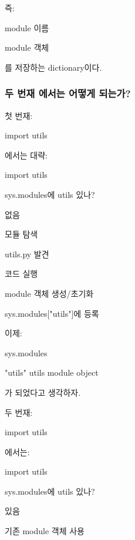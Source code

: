 즉:

\begin{dhksmry}[centered]
module 이름

\da

module 객체
\end{dhksmry}

를 저장하는 dictionary이다.

\subsubsection{두 번재 에서는 어떻게 되는가?}

첫 번재:

\begin{dhkcode}
import utils
\end{dhkcode}

에서는 대략:

\begin{dhksmry}[centered]
import utils

\da

sys.modules에 utils 있나?

\da

없음

\da

모듈 탐색

\da

utils.py 발견

\da

코드 실행

\da

module 객체 생성/초기화

\da

sys.modules["utils"]에 등록
\end{dhksmry}

이제:

\begin{dhksmry}
    sys.modules

    "utils" \ra utils module object
\end{dhksmry}

가 되었다고 생각하자.

두 번재:

\begin{dhkcode}
import utils
\end{dhkcode}

에서는:

\begin{dhksmry}[centered]
import utils

\da

sys.modules에 utils 있나?

\da

있음

\da

기존 module 객체 사용
\end{dhksmry}

